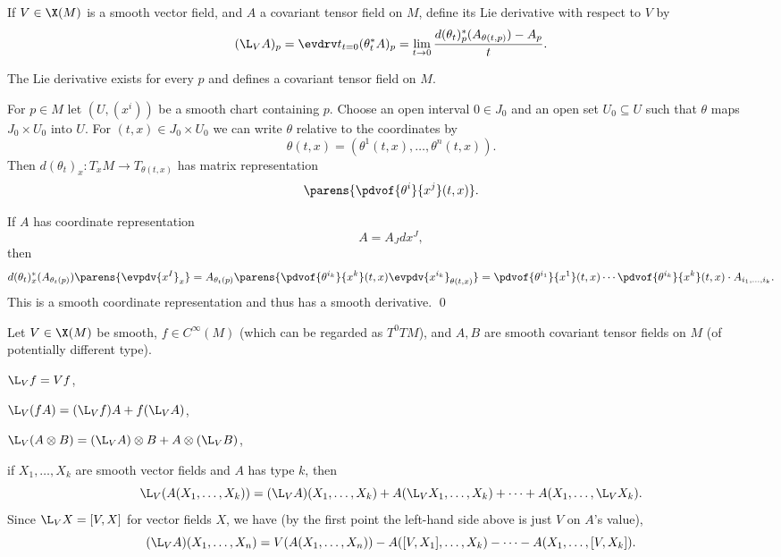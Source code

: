 \bdefn

    If $V\in\X(M)$ is a smooth vector field, and $A$ a covariant tensor field on $M$, define its {\emphcolor Lie derivative} with respect to $V$
    by
    $$ (\L_VA)_p = \evdrv t_{t=0}(\theta_t^*A)_p = \lim_{t\to0}\frac{d(\theta_t)^*_p(A_{\theta(t,p)}) - A_p}t . $$

\edefn

\blemm

    The Lie derivative exists for every $p$ and defines a covariant tensor field on $M$.

\elemm

\bproof

    For $p\in M$ let $(U,(x^i))$ be a smooth chart containing $p$.
    Choose an open interval $0\in J_0$ and an open set $U_0\subseteq U$ such that $\theta$ maps $J_0\times U_0$ into $U$.
    For $(t,x)\in J_0\times U_0$ we can write $\theta$ relative to the coordinates by
    $$ \theta(t,x) = (\theta^1(t,x),\dots,\theta^n(t,x)) . $$
    Then $d(\theta_t)_x\colon T_xM\to T_{\theta(t,x)}$ has matrix representation
    $$ \parens{\pdvof{\theta^i}{x^j}(t,x)} . $$

    If $A$ has coordinate representation
    $$ A = A_Jdx^J , $$
    then
    $$ d(\theta_t)^*_x(A_{\theta_t(p)})\parens{\evpdv{x^I}_x} =
    A_{\theta_t(p)}\parens{\pdvof{\theta^{i_k}}{x^k}(t,x)\evpdv{x^{i_k}}_{\theta(t,x)}} =
    \pdvof{\theta^{i_1}}{x^1}(t,x)\cdots\pdvof{\theta^{i_k}}{x^k}(t,x)\cdot A_{i_1,\dots,i_k} . $$
    This is a smooth coordinate representation and thus has a smooth derivative.
    \qed

\eproof

\bprop

    Let $V\in\X(M)$ be smooth, $f\in C^\infty(M)$ (which can be regarded as $T^0TM$), and $A,B$ are smooth covariant tensor fields on $M$
    (of potentially different type).
    \benum
        \item $\L_Vf=Vf$,
        \item $\L_V(fA)=(\L_Vf)A+f(\L_VA)$,
        \item $\L_V(A\otimes B)=(\L_VA)\otimes B+A\otimes(\L_VB)$,
        \item if $X_1,\dots,X_k$ are smooth vector fields and $A$ has type $k$, then
        $$ \L_V(A(X_1,\dots,X_k)) = (\L_VA)(X_1,\dots,X_k) + A(\L_VX_1,\dots,X_k) + \cdots + A(X_1,\dots,\L_VX_k) . $$
        Since $\L_VX=[V,X]$ for vector fields $X$, we have (by the first point the left-hand side above is just $V$ on $A$'s value),
        $$ (\L_VA)(X_1,\dots,X_n) = V(A(X_1,\dots,X_n)) - A([V,X_1],\dots,X_k) - \cdots - A(X_1,\dots,[V,X_k]) . $$
    \eenum

